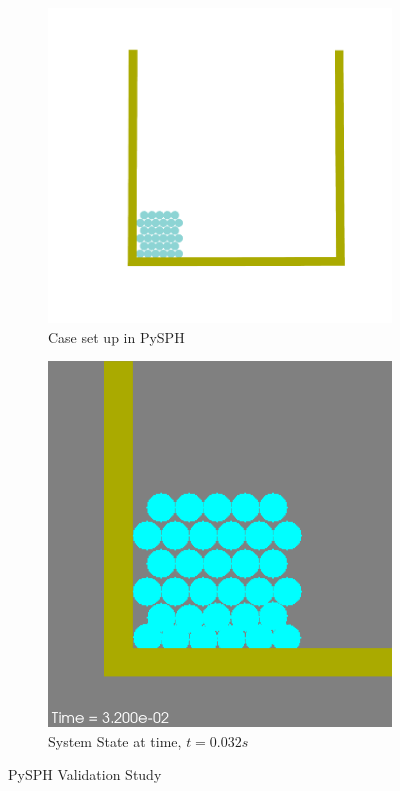 \begin{figure}[htb!]
 \begin{subfigure}{.5\textwidth}
  \centering
    \includegraphics[width=.94\linewidth]{figures/setup.png} 
    \caption{{\small{Case set up in PySPH}}}
    \label{fig:sim_setup}
 \end{subfigure}
 \begin{subfigure}{.5\textwidth}
  \centering
    \includegraphics[width=.8\linewidth]{figures/frame000031.png}
    \caption{{\small{System State at time, $t = 0.032 s$}}}
    \label{fig:bestresult_snapshot}
 \end{subfigure}
 \caption{PySPH Validation Study}
\end{figure}